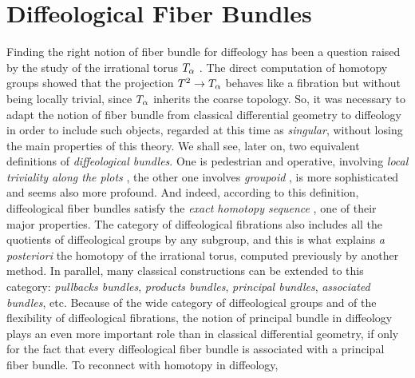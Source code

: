
\chapter{Diffeological Fiber Bundles}

\label{Chapter-Diffeological-Fiber-Bundles}
\newcommand{\ChapterDFB}{Diffeological Fiber Bundles}

\begin{chaphead}
  Finding the right notion of fiber bundle for diffeology \cite{Igl85} has been a question raised by the study of the irrational torus $T_\alpha$ \cite{DI83}.
  The direct computation of homotopy groups showed that the projection $T^2 \to {T}_{\alpha}$ behaves like a fibration but without being locally trivial,
  since ${T}_{\alpha}$ inherits the coarse topology.
  So,
  it was necessary to adapt the notion of fiber bundle from classical differential geometry to diffeology in order to include such objects,
  regarded at this time as {\em singular},
  without losing the main properties of this theory.
  We shall see,
  later on,
  two equivalent definitions of {\em diffeological bundles}.
  One is pedestrian and operative,
  involving {\em local triviality along the plots} ,
  the other one involves {\em groupoid} ,
  is more  sophisticated and seems also more profound.
  And indeed,
  according to this definition, diffeological fiber bundles satisfy the {\em exact homotopy sequence} ,
  one of their major properties.
  The category of diffeological fibrations also includes all the quotients of diffeological groups by any subgroup,
  and this is what explains {\em a posteriori} the homotopy of the irrational torus,
  computed previously by another method.
  In parallel,
  many classical constructions can be extended to this category:
  {\em pullbacks bundles}, {\em products bundles},
  {\em principal bundles},
  {\em associated bundles}, etc.
  Because of the wide category of diffeological groups and of the flexibility of diffeological fibrations,
  the notion of principal bundle in diffeology plays an even more important role than in classical differential geometry,
  if only for the fact that every diffeological fiber bundle is associated with a principal fiber bundle.
  To reconnect with homotopy in diffeology,

\end{chaphead}
